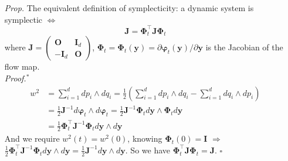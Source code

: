 \documentclass[a4paper, 11pt]{article}
\begin{document}
\begin{itemize}
	\item[\textit{Prop.}] The equivalent definition of symplecticity: a dynamic system is symplectic $\iff$
	$$
	\bm{J} = \bm{\Phi}_t^{\top} \bm{J} \bm{\Phi}_t
	$$
	where $\bm{J}=\begin{pmatrix}
		\bm{O} & \bm{I}_d \\
		-\bm{I}_d & \bm{O}
	\end{pmatrix}$, $\bm{\Phi}_t = \bm{\Phi}_t(\bm{y}) = \partial \bm{\varphi}_t(\bm{y})/\partial \bm{y}$ is the Jacobian of the flow map. \\
	\textit{Proof.$^*$~~}
	\begin{equation}
		\begin{split}
			w^2 &= \sum_{i=1}^d dp_i \wedge dq_i = \frac{1}{2}\left(\sum_{i=1}^d dp_i \wedge dq_i-\sum_{i=1}^d dq_i \wedge dp_i\right) \\
			&= \frac{1}{2}\bm{J}^{-1} d \bm{\varphi}_t \wedge d \bm{\varphi}_t = \frac{1}{2}\bm{J}^{-1} \bm{\Phi}_t d \bm{y} \wedge \bm{\Phi}_t d \bm{y} \\
			&= \frac{1}{2}\bm{\Phi}_t^{\top} \bm{J}^{-1} \bm{\Phi}_t d \bm{y} \wedge d \bm{y}
		\end{split}
	\end{equation}
	And we require $w^2(t)=w^2(0)$, knowing $\bm{\Phi}_t(0) = \bm{I}$ $\Rightarrow$ $\frac{1}{2}\bm{\Phi}_t^{\top} \bm{J}^{-1} \bm{\Phi}_t d \bm{y} \wedge d \bm{y} = \frac{1}{2} \bm{J}^{-1}  d \bm{y} \wedge d \bm{y}$. So we have $\bm{\Phi}_t^{\top} \bm{J} \bm{\Phi}_t = \bm{J}$. $\square$


\end{itemize}
\end{document}
